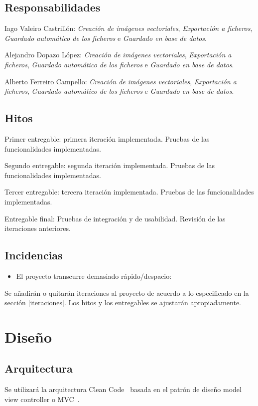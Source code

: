\documentclass[a4paper,openright,12pt]{article}
\begin{document}
\subsection{Responsabilidades}
Iago Valeiro Castrillón: 
\emph{Creación de imágenes vectoriales}, 
\emph{Exportación a ficheros}, 
\emph{Guardado automático de los ficheros} e 
\emph{Guardado en base de datos}.

Alejandro Dopazo López:
\emph{Creación de imágenes vectoriales}, 
\emph{Exportación a ficheros}, 
\emph{Guardado automático de los ficheros} e 
\emph{Guardado en base de datos}.

Alberto Ferreiro Campello:
\emph{Creación de imágenes vectoriales}, 
\emph{Exportación a ficheros}, 
\emph{Guardado automático de los ficheros} e 
\emph{Guardado en base de datos}.


\subsection{Hitos}
Primer entregable: primera iteración implementada. Pruebas de las funcionalidades implementadas.

Segundo entregable: segunda iteración implementada. Pruebas de las funcionalidades implementadas.

Tercer entregable: tercera iteración implementada. Pruebas de las funcionalidades implementadas.

Entregable final: Pruebas de integración y de usabilidad. Revisión de las iteraciones anteriores.

\subsection{Incidencias}
\begin{itemize}
    \item El proyecto transcurre demasiado rápido/despacio:
\end{itemize}
Se añadirán o quitarán iteraciones al proyecto de acuerdo a lo especificado en la sección \ref{iteraciones}. Los hitos y los entregables se ajustarán apropiadamente.



\section{Diseño}
\subsection{Arquitectura}
Se utilizará la arquitectura Clean Code~\cite{CleanCode} basada en el patrón de diseño model view controller o MVC~\cite{MVC}.
\end{document}

